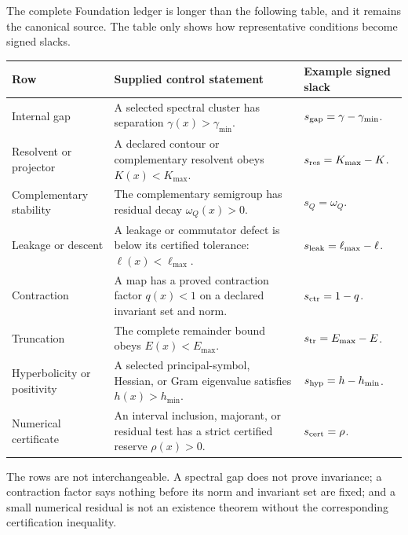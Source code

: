 \documentclass[11pt]{article}
\theoremstyle{definition}
\theoremstyle{remark}
\begin{document}
The complete Foundation ledger is longer than the following table, and it
remains the canonical source.  The table only shows how representative
conditions become signed slacks.

\begin{center}
\begin{tabularx}{\textwidth}{@{}L{0.20\textwidth}Y Y@{}}
\toprule
Row & Supplied control statement & Example signed slack \\
\midrule
Internal gap
& A selected spectral cluster has separation
  \(\gamma(x)>\gamma_{\min}\).
& \(s_{\rm gap}=\gamma-\gamma_{\min}\).\\

Resolvent or projector
& A declared contour or complementary resolvent obeys
  \(K(x)<K_{\max}\).
& \(s_{\rm res}=K_{\max}-K\).\\

Complementary stability
& The complementary semigroup has residual decay
  \(\omega_Q(x)>0\).
& \(s_Q=\omega_Q\).\\

Leakage or descent
& A leakage or commutator defect is below its certified tolerance:
  \(\ell(x)<\ell_{\max}\).
& \(s_{\rm leak}=\ell_{\max}-\ell\).\\

Contraction
& A map has a proved contraction factor \(q(x)<1\) on a declared invariant
  set and norm.
& \(s_{\rm ctr}=1-q\).\\

Truncation
& The complete remainder bound obeys
  \(E(x)<E_{\max}\).
& \(s_{\rm tr}=E_{\max}-E\).\\

Hyperbolicity or positivity
& A selected principal-symbol, Hessian, or Gram eigenvalue satisfies
  \(h(x)>h_{\min}\).
& \(s_{\rm hyp}=h-h_{\min}\).\\

Numerical certificate
& An interval inclusion, majorant, or residual test has a strict
  certified reserve \(\rho(x)>0\).
& \(s_{\rm cert}=\rho\).\\
\bottomrule
\end{tabularx}
\end{center}

The rows are not interchangeable.  A spectral gap does not prove
invariance; a contraction factor says nothing before its norm and invariant
set are fixed; and a small numerical residual is not an existence theorem
without the corresponding certification inequality.
\end{document}
